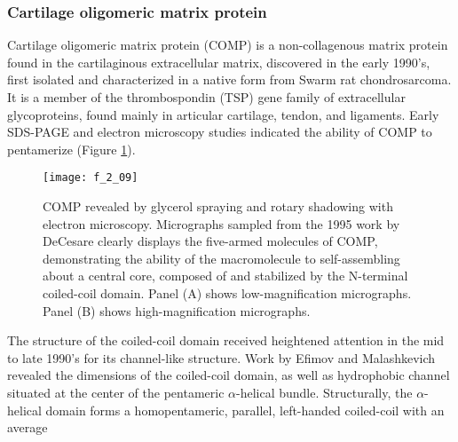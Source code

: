 \begin{refsection}
\subsubsection{Cartilage oligomeric matrix protein}

Cartilage oligomeric matrix protein (COMP) is a non-collagenous matrix protein
found in the cartilaginous extracellular matrix, discovered in the early 1990's,
first isolated and characterized in a native form from Swarm rat
chondrosarcoma.\cite{Morgelin1992} It is a member of the thrombospondin (TSP)
gene family of extracellular glycoproteins, found mainly in articular cartilage,
tendon, and
ligaments.\cite{Adams2001,Smith1997,Muller1998,Hedbom1992,Oldberg1992} Early
SDS-PAGE and electron microscopy studies indicated the ability of COMP to
pentamerize (Figure \ref{fig:COMP_EM_1}).\cite{DiCesare1995,Morgelin1992} 
\begin{figure}[h!] \centering \texttt{[image: f\_2\_09]}
    \caption[COMP revealed by glycerol spraying and rotary
        shadowing with electron microscopy. Micrographs sampled from the 1995
        work by DeCesare  clearly displays the five-armed
        molecules of COMP, demonstrating the ability of the macromolecule to
        self-assembling about a central core, composed of and stabilized by the
        N-terminal coiled-coil domain. Panel (A) shows low-magnification
    micrographs. Panel (B) shows high-magnification micrographs.]{COMP revealed by glycerol spraying and rotary
        shadowing with electron microscopy. Micrographs sampled from the 1995
        work by DeCesare  clearly displays the five-armed
        molecules of COMP, demonstrating the ability of the macromolecule to
        self-assembling about a central core, composed of and stabilized by the
        N-terminal coiled-coil domain. Panel (A) shows low-magnification
    micrographs. Panel (B) shows high-magnification micrographs.\cite{DiCesare1995}}\label{fig:COMP_EM_1} \end{figure}
The structure of the coiled-coil domain received heightened attention in the mid
to late 1990's for its channel-like structure. Work by Efimov and Malashkevich
revealed the dimensions of the coiled-coil domain, as well as hydrophobic
channel situated at the center of the pentameric ${\alpha}$-helical
bundle.\cite{Efimov1996,Malashkevich1996a} Structurally, the ${\alpha}$-helical
domain forms a homopentameric, parallel, left-handed coiled-coil with an average

\end{refsection}

